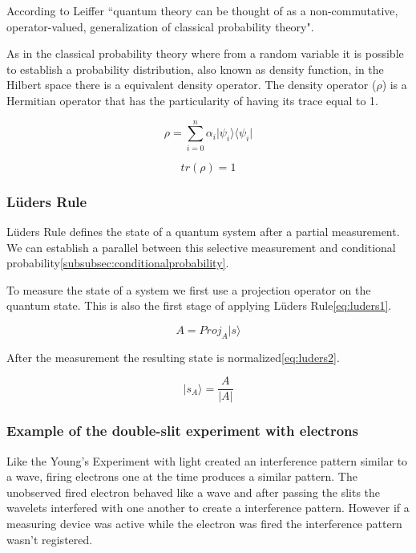 According to Leiffer\cite{Leifer2008} ``quantum theory can be thought of as a non-commutative, operator-valued, generalization of classical probability theory". 


As in the classical probability theory where from a random variable it is possible to establish a probability distribution, also known as density function, in the Hilbert space there is a equivalent density operator.
The density operator ($\rho$) is a Hermitian operator that has the particularity of having its trace equal to 1\cite{VanRijsbergen2004}.

\begin{equation}
\label{eq_trace1}
\rho = \sum_{i=0}^{n} \alpha_{i} \vert\psi_{i}\rangle\langle\psi_{i}\vert
\end{equation} 

\begin{equation}
\label{eq_trace1}
tr( \rho ) = 1
\end{equation}


\subsubsection{L\"{u}ders Rule}
\label{subsubsec:ludersrule}
L\"{u}ders Rule defines the state of a quantum system after a partial measurement. We can establish a parallel between this selective measurement and conditional probability\ref{subsubsec:conditionalprobability}\cite{Busch2009}.

To measure the state of a system we first use a projection operator on the quantum state. This is also the first stage of applying L\"{u}ders Rule\ref{eq:luders1}.

\begin{equation}
\label{eq:luders1}
A=Proj_{A}\vert s\rangle
\end{equation}

After the measurement the resulting state is normalized\ref{eq:luders2}.

\begin{equation}
\label{eq:luders2}
\vert s_{A}\rangle=\frac{A}{\vert A\vert}
\end{equation}

\subsubsection{Example of the double-slit experiment with electrons}
 Like the Young's Experiment with light created an interference pattern similar to a wave, firing electrons one at the time produces a similar pattern. The unobserved fired electron behaved like a wave and after passing the slits the wavelets interfered with one another to create a interference pattern. However if a measuring device was active while the electron was fired the interference pattern wasn't registered. 

